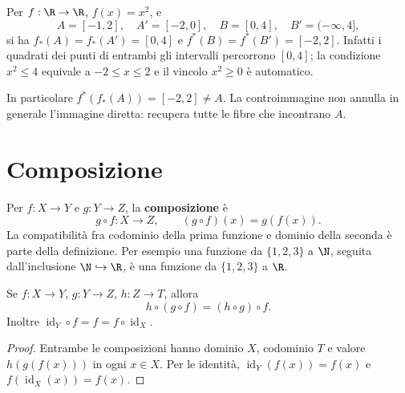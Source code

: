 \begin{esempio}[Il quadrato]
Per $f:\R\to\R$, $f(x)=x^2$, e
\[
A=[-1,2],\quad A'=[-2,0],\quad B=[0,4],\quad B'=(-\infty,4],
\]
si ha $f_*(A)=f_*(A')=[0,4]$ e $f^*(B)=f^*(B')=[-2,2]$. Infatti i quadrati dei punti di entrambi gli intervalli percorrono $[0,4]$; la condizione $x^2\le4$ equivale a $-2\le x\le2$ e il vincolo $x^2\ge0$ è automatico.

In particolare $f^*(f_*(A))=[-2,2]\ne A$. La controimmagine non annulla in generale l'immagine diretta: recupera tutte le fibre che incontrano $A$.
\end{esempio}

\begin{schema}
\end{schema}

\section{Composizione}
\begin{definizione}
Per $f:X\to Y$ e $g:Y\to Z$, la \textbf{composizione} è
\[
g\circ f:X\to Z,\qquad (g\circ f)(x)=g(f(x)).
\]
La compatibilità fra codominio della prima funzione e dominio della seconda è parte della definizione. Per esempio una funzione da $\{1,2,3\}$ a $\N$, seguita dall'inclusione $\N\hookrightarrow\R$, è una funzione da $\{1,2,3\}$ a $\R$.
\end{definizione}

\begin{proposizione}
Se $f:X\to Y$, $g:Y\to Z$, $h:Z\to T$, allora
\[
h\circ(g\circ f)=(h\circ g)\circ f.
\]
Inoltre $\operatorname{id}_Y\circ f=f=f\circ\operatorname{id}_X$.
\end{proposizione}
\begin{proof}
Entrambe le composizioni hanno dominio $X$, codominio $T$ e valore $h(g(f(x)))$ in ogni $x\in X$. Per le identità, $\operatorname{id}_Y(f(x))=f(x)$ e $f(\operatorname{id}_X(x))=f(x)$.
\end{proof}

